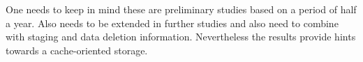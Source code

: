 

One needs to keep in mind these are preliminary studies based on a period of half a year. Also needs to be extended in further studies and also need to combine with staging and data deletion information. Nevertheless the results provide hints towards a cache-oriented storage.
